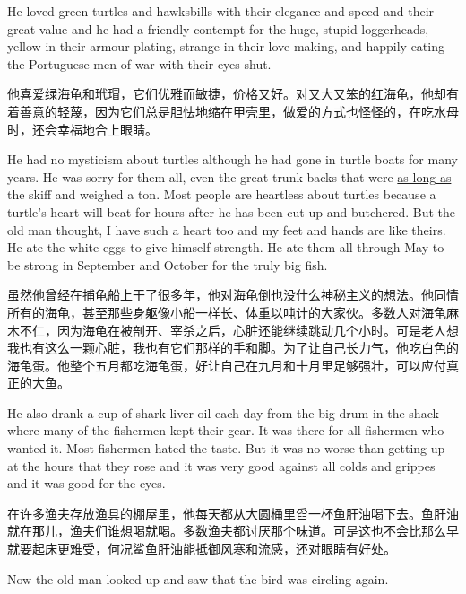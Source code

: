 \begin{paracol}{2}
He loved green turtles and \glspl{hawksbill} with their \gls{elegance} and
speed and their great value and he had a friendly \gls{contempt} for the
huge, stupid \glspl{loggerhead}, yellow in their armour-plating, strange in their
love-making, and happily eating the Portuguese men-of-war with their eyes
shut.

\switchcolumn

他喜爱绿海龟和玳瑁，它们优雅而敏捷，价格又好。对又大又笨的红海龟，他却有着善意的轻蔑，因为它们总是胆怯地缩在甲壳里，做爱的方式也怪怪的，在吃水母时，还会幸福地合上眼睛。

\switchcolumn*

He had no \gls{mysticism} about turtles although he had gone in turtle boats
for many years. He was sorry for them all, even the great \gls{trunk} \gls{backs}
that were \uline{as long as} the skiff and \gls{weighed} a ton. Most people are
\gls{heartless} about turtles because a turtle's heart will beat for hours
after he has been cut up and butchered. But the old man thought, I have such
a heart too and my feet and hands are like theirs. He ate the white eggs to
give himself strength. He ate them all through May to be strong in September
and October for the truly big fish.

\switchcolumn

虽然他曾经在捕龟船上干了很多年，他对海龟倒也没什么神秘主义的想法。他同情所有的海龟，甚至那些身躯像小船一样长、体重以吨计的大家伙。多数人对海龟麻木不仁，因为海龟在被剖开、宰杀之后，心脏还能继续跳动几个小时。可是老人想我也有这么一颗心脏，我也有它们那样的手和脚。为了让自己长力气，他吃白色的海龟蛋。他整个五月都吃海龟蛋，好让自己在九月和十月里足够强壮，可以应付真正的大鱼。

\switchcolumn*

He also drank a cup of shark liver oil each day from the big \gls{drum} in the
shack where many of the fishermen kept their gear. It was there for all
fishermen who wanted it. Most fishermen hated the taste. But it was no worse
than getting up at the hours that they rose and it was very good against all
colds and \gls{grippes} and it was good for the eyes.

\switchcolumn

在许多渔夫存放渔具的棚屋里，他每天都从大圆桶里舀一杯鱼肝油喝下去。鱼肝油就在那儿，渔夫们谁想喝就喝。多数渔夫都讨厌那个味道。可是这也不会比那么早就要起床更难受，何况鲨鱼肝油能抵御风寒和流感，还对眼睛有好处。

\switchcolumn*

Now the old man looked up and saw that the bird was circling again.


\end{paracol}
